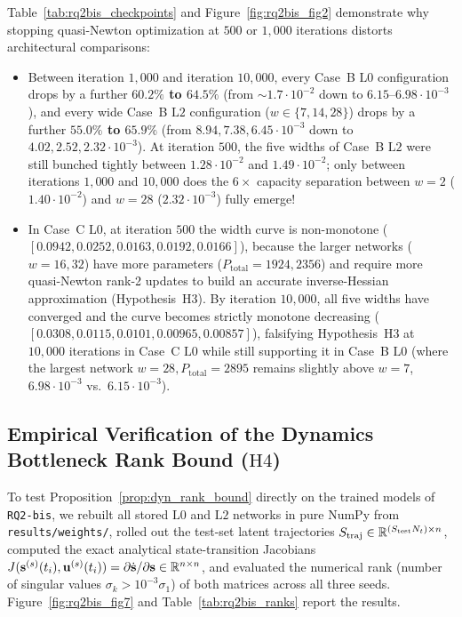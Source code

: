 Table~\ref{tab:rq2bis_checkpoints} and Figure~\ref{fig:rq2bis_fig2} demonstrate why stopping quasi-Newton optimization at $500$ or $1{,}000$ iterations distorts architectural comparisons:
\begin{itemize}[leftmargin=2em]
  \item Between iteration $1{,}000$ and iteration $10{,}000$, every Case~B $\mathrm{L0}$ configuration drops by a further \textbf{$60.2\%$ to $64.5\%$} (from $\sim 1.7\cdot 10^{-2}$ down to $6.15$--$6.98\cdot 10^{-3}$), and every wide Case~B $\mathrm{L2}$ configuration ($w \in \{7, 14, 28\}$) drops by a further \textbf{$55.0\%$ to $65.9\%$} (from $8.94, 7.38, 6.45\cdot 10^{-3}$ down to $4.02, 2.52, 2.32\cdot 10^{-3}$). At iteration $500$, the five widths of Case~B $\mathrm{L2}$ were still bunched tightly between $1.28\cdot 10^{-2}$ and $1.49\cdot 10^{-2}$; only between iterations $1{,}000$ and $10{,}000$ does the $6\times$ capacity separation between $w=2$ ($1.40\cdot 10^{-2}$) and $w=28$ ($2.32\cdot 10^{-3}$) fully emerge!
  \item In Case~C $\mathrm{L0}$, at iteration $500$ the width curve is non-monotone ($[0.0942, 0.0252, 0.0163, 0.0192, 0.0166]$), because the larger networks ($w=16, 32$) have more parameters ($P_{\mathrm{total}} = 1924, 2356$) and require more quasi-Newton rank-2 updates to build an accurate inverse-Hessian approximation (Hypothesis~H3). By iteration $10{,}000$, all five widths have converged and the curve becomes strictly monotone decreasing ($[0.0308, 0.0115, 0.0101, 0.00965, 0.00857]$), falsifying Hypothesis~H3 at $10{,}000$ iterations in Case~C $\mathrm{L0}$ while still supporting it in Case~B $\mathrm{L0}$ (where the largest network $w=28, P_{\mathrm{total}} = 2895$ remains slightly above $w=7$, $6.98\cdot 10^{-3}$ vs.\ $6.15\cdot 10^{-3}$).
\end{itemize}

\subsection{Empirical Verification of the Dynamics Bottleneck Rank Bound (\texorpdfstring{$\mathrm{H4}$}{H4})}

To test Proposition~\ref{prop:dyn_rank_bound} directly on the trained models of \texttt{RQ2-bis}, we rebuilt all stored $\mathrm{L0}$ and $\mathrm{L2}$ networks in pure NumPy from \texttt{results/weights/}, rolled out the test-set latent trajectories $S_{\mathrm{traj}} \in \mathbb{R}^{(S_{\mathrm{test}} N_t) \times n}$, computed the exact analytical state-transition Jacobians $J(\mathbf{s}^{(s)}(t_i), \mathbf{u}^{(s)}(t_i)) = \partial\dot{\mathbf{s}}/\partial\mathbf{s} \in \mathbb{R}^{n \times n}$, and evaluated the numerical rank (number of singular values $\sigma_k > 10^{-3}\sigma_1$) of both matrices across all three seeds. Figure~\ref{fig:rq2bis_fig7} and Table~\ref{tab:rq2bis_ranks} report the results.

